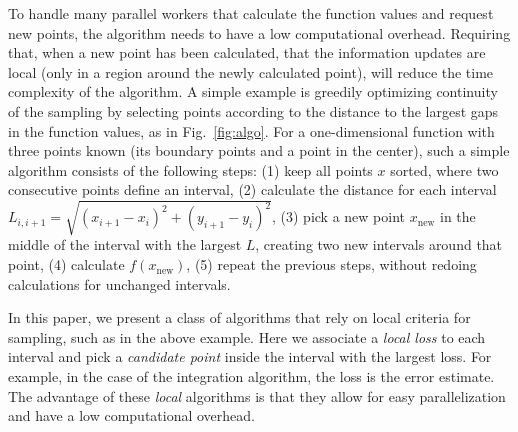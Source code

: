 
To handle many parallel workers that calculate the function values and request new points, the algorithm needs to have a low computational overhead.
Requiring that, when a new point has been calculated, that the information updates are local (only in a region around the newly calculated point), will reduce the time complexity of the algorithm.
A simple example is greedily optimizing continuity of the sampling by selecting points according to the distance to the largest gaps in the function values, as in Fig.~\ref{fig:algo}.
For a one-dimensional function with three points known (its boundary points and a point in the center), such a simple algorithm consists of the following steps:
(1) keep all points $x$ sorted, where two consecutive points define an interval,
(2) calculate the distance for each interval $L_{i, i+1}=\sqrt{(x_{i+1}-x_{i})^{2}+(y_{i+1}-y_{i})^{2}}$,
(3) pick a new point $x_\textrm{new}$ in the middle of the interval with the largest $L$, creating two new intervals around that point,
(4) calculate $f(x_\textrm{new})$,
(5) repeat the previous steps, without redoing calculations for unchanged intervals.

In this paper, we present a class of algorithms that rely on local criteria for sampling, such as in the above example.
Here we associate a \emph{local loss} to each interval and pick a \emph{candidate point} inside the interval with the largest loss.
For example, in the case of the integration algorithm, the loss is the error estimate.
The advantage of these \emph{local} algorithms is that they allow for easy parallelization and have a low computational overhead.

